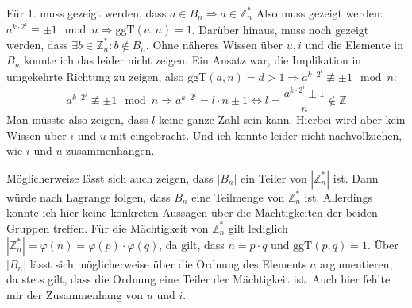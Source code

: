 \documentclass[DIN, pagenumber=false, fontsize=11pt, parskip=half]{scrartcl}
\newcommand{\Z}[0]{\mathbb{Z}}
\newcommand{\ggt}{\text{ggT}}
\newcommand{\congTo}[2]{\equiv #1\mod #2}
\begin{document}
    Für 1. muss gezeigt werden, dass $a \in B_n \Rightarrow a \in \Z_n^*$ Also muss gezeigt werden: $a^{k \cdot 2^i} \congTo{\pm 1}{n} \Rightarrow \ggt(a, n) = 1$.
    Darüber hinaus, muss noch gezeigt werden, dass $\exists b \in \Z_n^* : b \notin B_n$.
    Ohne näheres Wissen über $u, i$ und die Elemente in $B_n$ konnte ich das leider nicht zeigen. Ein Ansatz war, die Implikation in umgekehrte Richtung zu zeigen,
    also $\ggt(a, n) = d > 1 \Rightarrow a^{k \cdot 2^i} \not\congTo{\pm 1}{n}$:
    \begin{equation*}
        a^{k \cdot 2^i} \not\congTo{\pm 1}{n} \Rightarrow a^{k \cdot 2^i} = l \cdot n \pm 1 \Leftrightarrow l = \frac{a ^{k \cdot 2^i} \pm 1}{n} \notin \Z
    \end{equation*}
    Man müsste also zeigen, dass $l$ keine ganze Zahl sein kann. Hierbei wird aber kein Wissen über $i$ und $u$ mit eingebracht. Und ich konnte leider nicht
    nachvollziehen, wie $i$ und $u$ zusammenhängen.

    Möglicherweise lässt sich auch zeigen, dass $|B_n|$ ein Teiler von $|\Z_n^*|$ ist. Dann würde nach Lagrange folgen, dass $B_n$ eine Teilmenge von $\Z_n^*$
    ist. Allerdings konnte ich hier keine konkreten Aussagen über die Mächtigkeiten der beiden Gruppen treffen. Für die Mächtigkeit von $\Z_n^*$ gilt lediglich
    $|\Z_n^*| = \varphi(n) = \varphi(p) \cdot \varphi(q)$, da gilt, dass $n = p \cdot q$ und $\ggt(p, q) = 1$. Über $|B_n|$ lässt sich möglicherweise über die
    Ordnung des Elements $a$ argumentieren, da stets gilt, dass die Ordnung eine Teiler der Mächtigkeit ist. Auch hier fehlte mir der Zusammenhang von $u$ und $i$.
\end{document}
